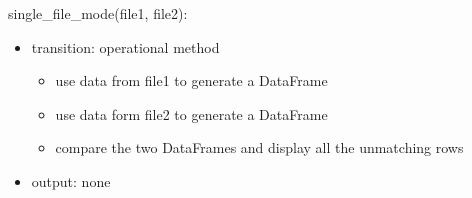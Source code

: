 \documentclass[12pt]{article}
\begin{document}



\noindent single\_file\_mode(file1, file2):
\begin{itemize}
  \item transition: operational method 
  \begin{itemize}[\null]
    \item use data from file1 to generate a DataFrame
    \item use data form file2 to generate a DataFrame
    \item compare the two DataFrames and display all the unmatching rows
  \end{itemize}
  \item output: none
\end{itemize}
\end{document}
